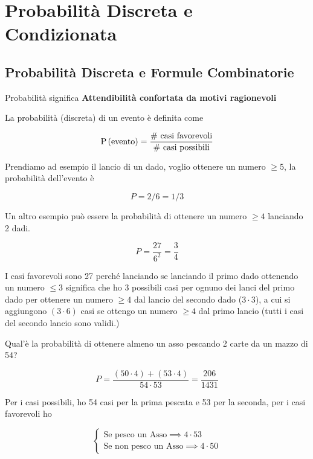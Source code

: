 \chapter{Probabilità Discreta e Condizionata}

\section{Probabilità Discreta e Formule Combinatorie}

\begin{defn}
	Probabilità significa \textbf{Attendibilità confortata da motivi ragionevoli}
	
	
	La probabilità (discreta) di un evento è definita come 
	
	\begin{equation}
		\text{P}\left(\text{evento}\right) = \dfrac{\text{\# casi favorevoli}}{\text{\# casi possibili}}
	\end{equation}
	
\end{defn}

\begin{exmp}
	Prendiamo ad esempio il lancio di un dado, voglio ottenere un numero $ \geq 5 $, la probabilità dell'evento è
	
	\begin{equation*}
		P = 2/6 = 1/3
	\end{equation*}
	
	Un altro esempio può essere la probabilità di ottenere un numero $ \geq 4 $ lanciando 2 dadi.
	
	\begin{equation*}
		P = \dfrac{27}{6^2} = \dfrac{3}{4}
	\end{equation*}
	
	I casi favorevoli sono 27 perché lanciando se lanciando il primo dado ottenendo un numero $ \leq 3 $ significa che ho 3 possibili casi per ognuno dei lanci del primo dado per ottenere un numero $ \geq 4 $ dal lancio del secondo dado ($ 3 \cdot 3 $), a cui si aggiungono $ (3 \cdot 6) $ casi se ottengo un numero $ \geq 4 $ dal primo lancio (tutti i casi del secondo lancio sono validi.)
\end{exmp}

\begin{exmp}
	Qual'è la probabilità di ottenere almeno un asso pescando 2 carte da un mazzo di 54?
	
	\begin{equation*}
	P = \dfrac{(50 \cdot 4) + (53 \cdot 4)}{54 \cdot 53} = \dfrac{206}{1431}
	\end{equation*}
	
	Per i casi possibili, ho 54 casi per la prima pescata e 53 per la seconda, per i casi favorevoli ho
	
	\begin{equation*}
	\begin{cases}
	\text{Se pesco un Asso} \implies 4 \cdot 53 \\
	\text{Se non pesco un Asso} \implies 4 \cdot 50
	\end{cases}
	\end{equation*}
	
\end{exmp}


